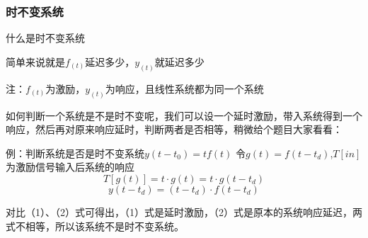 \documentclass[UTF8,a4paper,12pt]{ctexart}
\begin{document}
  \subsubsection{时不变系统}
    \begin{titlebox}{什么是时不变系统}
      \begin{flushleft}
        简单来说就是$f_{(t)}$延迟多少，$y_{(t)}$就延迟多少
      \end{flushleft}
      \begin{flushleft}

        \par {\scriptsize 注：$f_{(t)}$为激励，$y_{(t)}$为响应，且线性系统都为同一个系统}
        \par 如何判断一个系统是不是时不变呢，我们可以设一个延时激励，带入系统得到一个响应，然后再对原来响应延时，判断两者是否相等，稍微给个题目大家看看：
        \begin{center}
           \par 例：判断系统是否是时不变系统$y(t-t_0)=tf(t)$
           令$g(t)=f(t-t_d)$,$T[in]$为激励信号输入后系统的响应
           \begin{equation}
            T[g(t)] = t\cdot g(t)=t\cdot g(t-t_d)
            \end{equation}
            \begin{equation}
              y(t-t_d)= (t-t_d) \cdot f(t-t_d)
              \end{equation}
          \begin{flushleft}
              对比（1）、（2）式可得出，（1）式是延时激励，（2）式是原本的系统响应延迟，两式不相等，所以该系统不是时不变系统。  
          \end{flushleft}
           
        \end{center}
       
      \end{flushleft}
    \end{titlebox}
    
\end{document}
